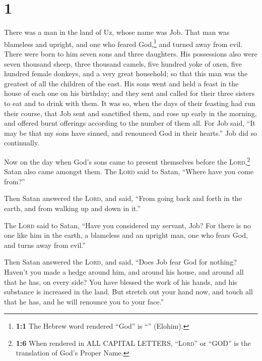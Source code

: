 \hypertarget{section}{%
\section{1}\label{section}}

 There was a man in the land of Uz, whose name was Job.
That man was blameless and upright, and one who feared God,\footnote{\textbf{1:1}
  The Hebrew word rendered ``God'' is ``'' (Elohim).} and
turned away from evil.  There were born to him seven sons
and three daughters.  His possessions also were seven
thousand sheep, three thousand camels, five hundred yoke of oxen, five
hundred female donkeys, and a very great household; so that this man was
the greatest of all the children of the east.  His sons
went and held a feast in the house of each one on his birthday; and they
sent and called for their three sisters to eat and to drink with them.
 It was so, when the days of their feasting had run their
course, that Job sent and sanctified them, and rose up early in the
morning, and offered burnt offerings according to the number of them
all. For Job said, ``It may be that my sons have sinned, and renounced
God in their hearts.'' Job did so continually.

 Now on the day when God's sons came to present themselves
before the \textsc{Lord},\footnote{\textbf{1:6} When rendered in ALL
  CAPITAL LETTERS, ``\textsc{Lord}'' or ``GOD'' is the translation of
  God's Proper Name.} Satan also came amongst them.  The
\textsc{Lord} said to Satan, ``Where have you come from?''

Then Satan answered the \textsc{Lord}, and said, ``From going back and
forth in the earth, and from walking up and down in it.''

 The \textsc{Lord} said to Satan, ``Have you considered my
servant, Job? For there is no one like him in the earth, a blameless and
an upright man, one who fears God, and turns away from evil.''

 Then Satan answered the \textsc{Lord}, and said, ``Does
Job fear God for nothing?  Haven't you made a hedge
around him, and around his house, and around all that he has, on every
side? You have blessed the work of his hands, and his substance is
increased in the land.  But stretch out your hand now,
and touch all that he has, and he will renounce you to your face.''

